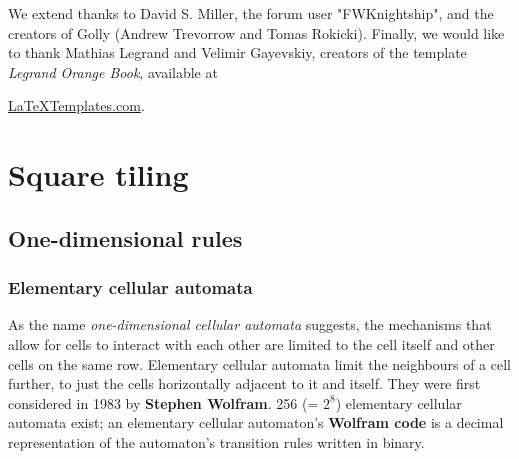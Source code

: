 \documentclass[
	11pt, %
	fleqn, %
	a4paper, %
]{LegrandOrangeBook}
\begin{document}
We extend thanks to David S. Miller, the forum user "FWKnightship", and  the creators of Golly (Andrew Trevorrow and Tomas Rokicki). Finally, we would like to thank Mathias Legrand and Velimir Gayevskiy, creators of the template \textit{Legrand Orange Book}, available at {\href{https://www.latextemplates.com/template/legrand-orange-book}{LaTeXTemplates.com}.

\mainmatter

\part{Square tiling}
\chapterspaceabove{6.75cm} %
\chapterspacebelow{7.25cm} %
\chapter{One-dimensional rules}
\section{Elementary cellular automata}
As the name \textit{one-dimensional cellular automata} suggests, the mechanisms that allow for cells to interact with each other are limited to the cell itself and other cells on the same row. Elementary cellular automata limit the neighbours of a cell further, to just the cells horizontally adjacent to it and itself. They were first considered in 1983 by \textbf{Stephen Wolfram}. 256 (= $2^8$) elementary cellular automata exist; an elementary cellular automaton's \textbf{Wolfram code} is a decimal representation of the automaton's transition rules written in binary. 
\chapterspaceabove{6.75cm} %
\chapterspacebelow{7.25cm} %
}
\end{document}
